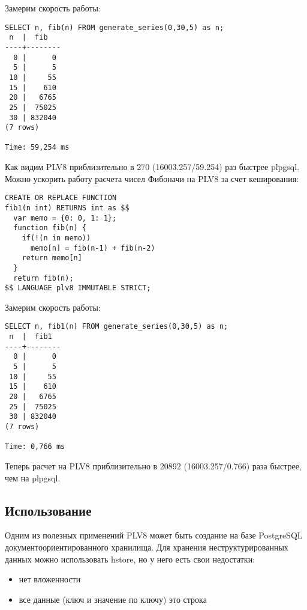 Замерим скорость работы:

\begin{lstlisting}[label=lst:plv8js4,caption=Скорость расчета числа Фибоначчи на plv8]
SELECT n, fib(n) FROM generate_series(0,30,5) as n;
 n  |  fib   
----+--------
  0 |      0
  5 |      5
 10 |     55
 15 |    610
 20 |   6765
 25 |  75025
 30 | 832040
(7 rows)

Time: 59,254 ms
\end{lstlisting}

Как видим PLV8 приблизительно в 270 (16003.257/59.254) раз быстрее plpgsql. Можно ускорить работу расчета чисел Фибоначи на PLV8 за счет кеширования:

\begin{lstlisting}[label=lst:plv8js5,caption=Фибоначчи на plv8]
CREATE OR REPLACE FUNCTION
fib1(n int) RETURNS int as $$
  var memo = {0: 0, 1: 1};
  function fib(n) {
    if(!(n in memo))
      memo[n] = fib(n-1) + fib(n-2)
    return memo[n]
  }
  return fib(n);
$$ LANGUAGE plv8 IMMUTABLE STRICT;
\end{lstlisting}

Замерим скорость работы:

\begin{lstlisting}[label=lst:plv8js6,caption=Скорость расчета числа Фибоначчи на plv8]
SELECT n, fib1(n) FROM generate_series(0,30,5) as n;
 n  |  fib1  
----+--------
  0 |      0
  5 |      5
 10 |     55
 15 |    610
 20 |   6765
 25 |  75025
 30 | 832040
(7 rows)

Time: 0,766 ms
\end{lstlisting}

Теперь расчет на PLV8 приблизительно в 20892 (16003.257/0.766) раза быстрее, чем на plpgsql.

\subsection{Использование}

Одним из полезных применений PLV8 может быть создание на базе PostgreSQL документоориентированного хранилища. Для хранения неструктурированных данных можно использовать hstore, но у него есть свои недостатки:

\begin{itemize}
\item нет вложенности
\item все данные (ключ и значение по ключу) это строка
\end{itemize}

